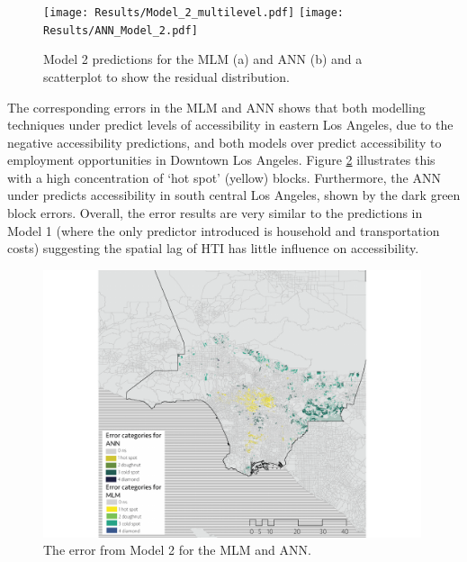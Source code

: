 \documentclass[a4paper,UKenglish]{lipics-v2018}
\begin{document}
\begin{figure}[H]
    \texttt{[image: Results/Model\_2\_multilevel.pdf]}
    \texttt{[image: Results/ANN\_Model\_2.pdf]}
    \caption[Model 2 predictions]{Model 2 predictions for the MLM (a) and ANN (b) and a scatterplot to show the residual distribution.} 
    \label{fig:Model_2_multilevel}
\end{figure}

The corresponding errors in the MLM and ANN shows that both modelling techniques under predict levels of accessibility in eastern Los Angeles, due to the negative accessibility predictions, and both models over predict accessibility to employment opportunities in Downtown Los Angeles. Figure \ref{fig:Error_2_MLM_ANN} illustrates this with a high concentration of ‘hot spot’ (yellow) blocks. Furthermore, the ANN under predicts accessibility in south central Los Angeles, shown by the dark green block errors. Overall, the error results are very similar to the predictions in Model 1 (where the only predictor introduced is household and transportation costs) suggesting the spatial lag of HTI has little influence on accessibility.

\begin{figure}[H]
    \centering
    \includegraphics[width=0.99\textwidth]{Error/Error_2_MLM_ANN.pdf}
    \caption[Model 2 error]{The error from Model 2 for the MLM and ANN.} 
    \label{fig:Error_2_MLM_ANN}
\end{figure}
\end{document}
